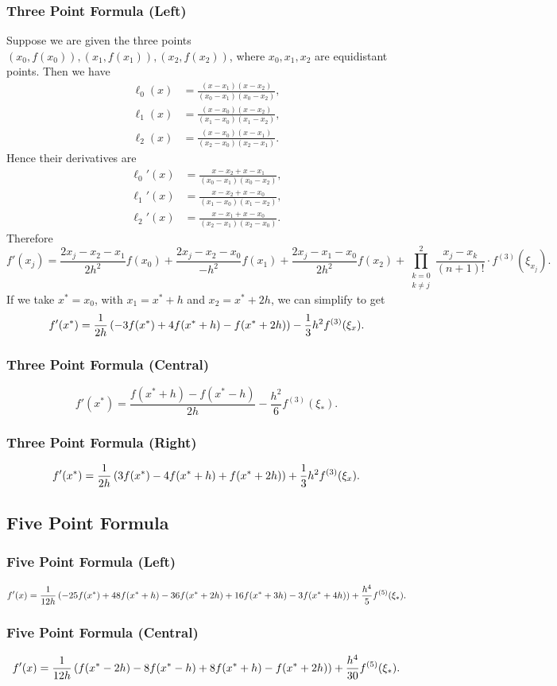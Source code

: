 \documentclass[class=article, crop=false]{standalone}
\begin{document}
  \subsubsection{Three Point Formula (Left)}
  Suppose we are given the three points $(x_0, f(x_0)), (x_1, f(x_1)), (x_2, f(x_2))$, where $x_0, x_1, x_2$ are equidistant points. Then we have
  \begin{align*}
    \ell_0(x) &= \frac{(x - x_1)(x - x_2)}{(x_0 - x_1)(x_0 - x_2)}, \\
    \ell_1(x) &= \frac{(x - x_0)(x - x_2)}{(x_1 - x_0)(x_1 - x_2)}, \\
    \ell_2(x) &= \frac{(x - x_0)(x - x_1)}{(x_2 - x_0)(x_2 - x_1)}.
  \end{align*}
  Hence their derivatives are
  \begin{align*}
    \ell_0'(x) &= \frac{x - x_2 + x - x_1}{(x_0 - x_1)(x_0 - x_2)}, \\
    \ell_1'(x) &= \frac{x - x_2 + x - x_0}{(x_1 - x_0)(x_1 - x_2)}, \\
    \ell_2'(x) &= \frac{x - x_1 + x - x_0}{(x_2 - x_1)(x_2 - x_0)}.
  \end{align*}
  Therefore
  \[
    f'(x_j) = \frac{2x_j - x_2 - x_1}{2h^2}f(x_0) + \frac{2x_j - x_2 - x_0}{-h^2}f(x_1) + \frac{2x_j - x_1 - x_0}{2h^2}f(x_2) + \prod_{\substack{k = 0\\k\neq j}}^{2} \frac{x_j - x_k}{(n + 1)!}\cdot f^{(3)}(\xi_{x_j}).
  \]
  If we take $x^* = x_0$, with $x_1 = x^* + h$ and $x_2 = x^* + 2h$, we can simplify to get
  \[
    f'(x^*) = \frac{1}{2h}\left( -3f(x^*) + 4f(x^* + h) - f(x^* + 2h) \right) - \frac{1}{3}h^2f^{(3)}(\xi_x).
  \]
  \subsubsection{Three Point Formula (Central)}
  \[
    f'(x^*) = \frac{f(x^* + h) - f(x^* - h)}{2h} - \frac{h^2}{6}f^{(3)}(\xi_*).
  \]
  \subsubsection{Three Point Formula (Right)}
  \[
    f'(x^*) = \frac{1}{2h}\left( 3f(x^*) - 4f(x^* + h) + f(x^* + 2h) \right) + \frac{1}{3}h^2f^{(3)}(\xi_x).
  \]
  \subsection{Five Point Formula}
  \subsubsection{Five Point Formula (Left)}
  \[
    f'(x) = \frac{1}{12h}\left( -25f(x^*) + 48f(x^* + h) - 36f(x^* + 2h) + 16f(x^* + 3h) - 3f(x^* + 4h) \right) + \frac{h^4}{5}f^{(5)}(\xi_*).
  \]
  \subsubsection{Five Point Formula (Central)}
  \[
    f'(x) = \frac{1}{12h}\left( f(x^* - 2h) - 8f(x^* - h) + 8f(x^* + h) - f(x^* + 2h) \right) + \frac{h^4}{30}f^{(5)}(\xi_*).
  \]
\end{document}
